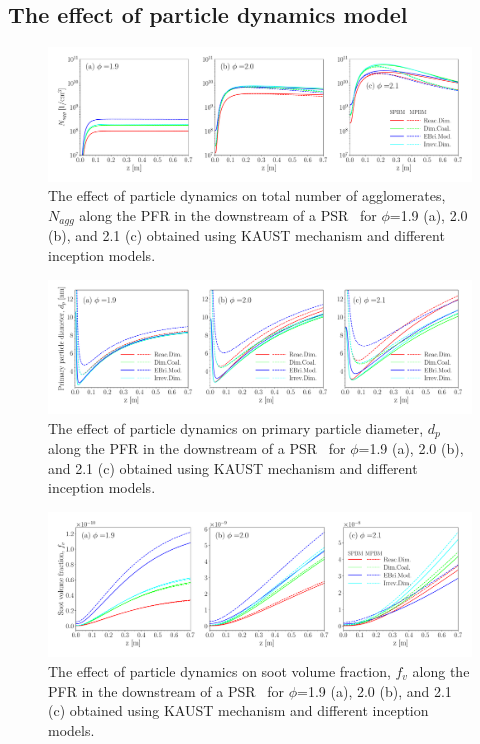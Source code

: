 \subsection{The effect of particle dynamics model}

\begin{figure}[H]
	\centering
	\includegraphics[width=1\textwidth]{Figures/Results/PSR/N_agg_eq_ratio_pdynamiceffect.pdf}
	\caption{The effect of particle dynamics on total number of agglomerates, $N_{agg}$ along the PFR in the downstream of a PSR~\citep{manzello2007soot} for $\phi$=1.9 (a), 2.0 (b), and 2.1 (c) obtained using KAUST mechanism and different inception models.}
	\label{fig:psr_Nagg_pdynamicseffect} 
\end{figure}

\begin{figure}[H]
	\centering
	\includegraphics[width=1\textwidth]{Figures/Results/PSR/d_p_eq_ratio_pdynamiceffect.pdf}
	\caption{The effect of particle dynamics on primary particle diameter, $d_{p}$ along the PFR in the downstream of a PSR~\citep{manzello2007soot} for $\phi$=1.9 (a), 2.0 (b), and 2.1 (c) obtained using KAUST mechanism and different inception models.}
	\label{fig:psr_d_p_pdynamicseffect} 
\end{figure}


\begin{figure}[H]
	\centering
	\includegraphics[width=1\textwidth]{Figures/Results/PSR/f_v_eq_ratio_pdynamiceffect.pdf}
	\caption{The effect of particle dynamics on soot volume fraction, $f_{v}$ along the PFR in the downstream of a PSR~\citep{manzello2007soot} for $\phi$=1.9 (a), 2.0 (b), and 2.1 (c) obtained using KAUST mechanism and different inception models.}
	\label{fig:psr_f_v_pdynamicseffect} 
\end{figure}

